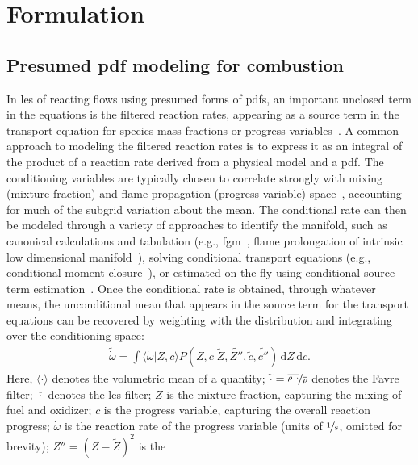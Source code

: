 \documentclass[review]{elsarticle}
\newcommand{\ud}{\,\mathrm{d}}
\newcommand{\wt}[1]{\widetilde{#1}}
\newcommand{\ol}[1]{\overline{#1}}
\begin{document}
\section{Formulation}\label{sec:formulation}

\subsection{Presumed \acrlong{pdf} modeling for combustion}\label{sec:physics}

In \gls{les} of reacting flows using presumed forms of \glspl{pdf}, an
important unclosed term in the equations is the filtered reaction
rates, appearing as a source term in the transport equation for
species mass fractions or progress
variables~\cite{Veynante2002,Pitsch2006a}. A common approach to
modeling the filtered reaction rates is to express it as an integral
of the product of a reaction rate derived from a physical model and a \gls{pdf}. The
conditioning variables are typically chosen to correlate strongly with
mixing (mixture fraction) and flame propagation (progress variable)
space~\cite{Bradley1998, Bradley2002}, accounting for much of the subgrid variation about the
mean. The conditional rate can then be modeled through a variety of
approaches to identify the manifold, such as canonical calculations
and tabulation (e.g., \acrlong{fgm}~\cite{VanOijen2002}, flame
prolongation of intrinsic low dimensional
manifold~\cite{Gicquel2000}), solving conditional transport equations
(e.g., conditional moment closure~\cite{Klimenko1999}), or estimated
on the fly using conditional source term
estimation~\cite{JinGB08}. Once the conditional rate is obtained,
through whatever means, the unconditional mean that appears in the
source term for the transport equations can be recovered by weighting
with the distribution and integrating over the conditioning space:
\begin{align}\label{eq:convolution}
  \wt{\dot{\omega}} = \int \langle \dot{\omega} | Z, c \rangle P(Z,c | \wt{Z}, \wt{Z''}, \wt{c}, \wt{c''}) \ud Z \ud c.
\end{align}
Here, $\langle \cdot \rangle$ denotes the volumetric mean of a
quantity; $\wt{\cdot} = \nicefrac{\ol{\rho~\cdot}}{\ol{\rho}}$ denotes
the Favre filter; $\ol{\cdot}$ denotes the \gls{les} filter; $Z$ is
the mixture fraction, capturing the mixing of fuel and oxidizer; $c$
is the progress variable, capturing the overall reaction progress;
$\dot{\omega}$ is the reaction rate of the progress variable (units of
$\unitfrac{1}{s}$, omitted for brevity); $Z'' = (Z-\wt{Z})^2$ is the
\end{document}
